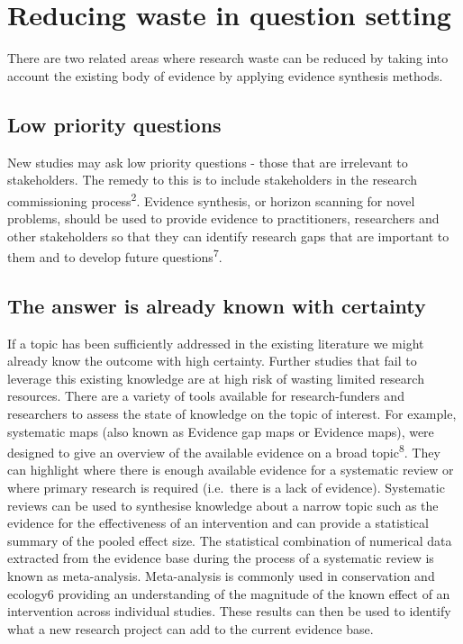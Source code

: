 \documentclass[]{article}
\begin{document}
\hypertarget{reducing-waste-in-question-setting}{%
\section{Reducing waste in question
setting}\label{reducing-waste-in-question-setting}}

There are two related areas where research waste can be reduced by
taking into account the existing body of evidence by applying evidence
synthesis methods.

\hypertarget{low-priority-questions}{%
\subsection{Low priority questions}\label{low-priority-questions}}

New studies may ask low priority questions - those that are irrelevant
to stakeholders. The remedy to this is to include stakeholders in the
research commissioning process\textsuperscript{2}. Evidence synthesis,
or horizon scanning for novel problems, should be used to provide
evidence to practitioners, researchers and other stakeholders so that
they can identify research gaps that are important to them and to
develop future questions\textsuperscript{7}.

\hypertarget{the-answer-is-already-known-with-certainty}{%
\subsection{The answer is already known with
certainty}\label{the-answer-is-already-known-with-certainty}}

If a topic has been sufficiently addressed in the existing literature we
might already know the outcome with high certainty. Further studies that
fail to leverage this existing knowledge are at high risk of wasting
limited research resources. There are a variety of tools available for
research-funders and researchers to assess the state of knowledge on the
topic of interest. For example, systematic maps (also known as Evidence
gap maps or Evidence maps), were designed to give an overview of the
available evidence on a broad topic\textsuperscript{8}. They can
highlight where there is enough available evidence for a systematic
review or where primary research is required (i.e.~there is a lack of
evidence). Systematic reviews can be used to synthesise knowledge about
a narrow topic such as the evidence for the effectiveness of an
intervention and can provide a statistical summary of the pooled effect
size. The statistical combination of numerical data extracted from the
evidence base during the process of a systematic review is known as
meta-analysis. Meta-analysis is commonly used in conservation and
ecology6 providing an understanding of the magnitude of the known effect
of an intervention across individual studies. These results can then be
used to identify what a new research project can add to the current
evidence base.
\end{document}
